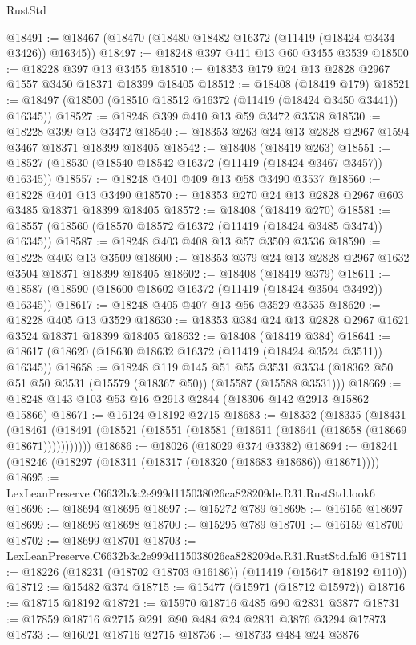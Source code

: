 \begin{lexlean}{RustStd}
\begin{coremodule}
@18491 := @18467 (@18470 (@18480 @18482 @16372 (@11419 (@18424 @3434 @3426)) @16345))
@18497 := @18248 @397 @411 @13 @60 @3455 @3539
@18500 := @18228 @397 @13 @3455
@18510 := @18353 @179 @24 @13 @2828 @2967 @1557 @3450 @18371 @18399 @18405
@18512 := @18408 (@18419 @179)
@18521 := @18497 (@18500 (@18510 @18512 @16372 (@11419 (@18424 @3450 @3441)) @16345))
@18527 := @18248 @399 @410 @13 @59 @3472 @3538
@18530 := @18228 @399 @13 @3472
@18540 := @18353 @263 @24 @13 @2828 @2967 @1594 @3467 @18371 @18399 @18405
@18542 := @18408 (@18419 @263)
@18551 := @18527 (@18530 (@18540 @18542 @16372 (@11419 (@18424 @3467 @3457)) @16345))
@18557 := @18248 @401 @409 @13 @58 @3490 @3537
@18560 := @18228 @401 @13 @3490
@18570 := @18353 @270 @24 @13 @2828 @2967 @603 @3485 @18371 @18399 @18405
@18572 := @18408 (@18419 @270)
@18581 := @18557 (@18560 (@18570 @18572 @16372 (@11419 (@18424 @3485 @3474)) @16345))
@18587 := @18248 @403 @408 @13 @57 @3509 @3536
@18590 := @18228 @403 @13 @3509
@18600 := @18353 @379 @24 @13 @2828 @2967 @1632 @3504 @18371 @18399 @18405
@18602 := @18408 (@18419 @379)
@18611 := @18587 (@18590 (@18600 @18602 @16372 (@11419 (@18424 @3504 @3492)) @16345))
@18617 := @18248 @405 @407 @13 @56 @3529 @3535
@18620 := @18228 @405 @13 @3529
@18630 := @18353 @384 @24 @13 @2828 @2967 @1621 @3524 @18371 @18399 @18405
@18632 := @18408 (@18419 @384)
@18641 := @18617 (@18620 (@18630 @18632 @16372 (@11419 (@18424 @3524 @3511)) @16345))
@18658 := @18248
    @119
    @145
    @51
    @55
    @3531
    @3534
    (@18362 @50 @51 @50 @3531 (@15579 (@18367 @50)) (@15587 (@15588 @3531)))
@18669 := @18248 @143 @103 @53 @16 @2913 @2844 (@18306 @142 @2913 @15862 @15866)
@18671 := @16124 @18192 @2715
@18683 := @18332
    (@18335
      (@18431
        (@18461 (@18491 (@18521 (@18551 (@18581 (@18611 (@18641 (@18658 (@18669 @18671)))))))))))
@18686 := @18026 (@18029 @374 @3382)
@18694 := @18241 (@18246 (@18297 (@18311 (@18317 (@18320 (@18683 @18686)) @18671))))
@18695 := LexLeanPreserve.C6632b3a2e999d115038026ca828209de.R31.RustStd.look6
@18696 := @18694 @18695
@18697 := @15272 @789
@18698 := @16155 @18697
@18699 := @18696 @18698
@18700 := @15295 @789
@18701 := @16159 @18700
@18702 := @18699 @18701
@18703 := LexLeanPreserve.C6632b3a2e999d115038026ca828209de.R31.RustStd.fal6
@18711 := @18226 (@18231 (@18702 @18703 @16186)) (@11419 (@15647 @18192 @110))
@18712 := @15482 @374
@18715 := @15477 (@15971 (@18712 @15972))
@18716 := @18715 @18192
@18721 := @15970 @18716 @485 @90 @2831 @3877
@18731 := @17859 @18716 @2715 @291 @90 @484 @24 @2831 @3876 @3294 @17873
@18733 := @16021 @18716 @2715
@18736 := @18733 @484 @24 @3876

\end{coremodule}
\end{lexlean}
